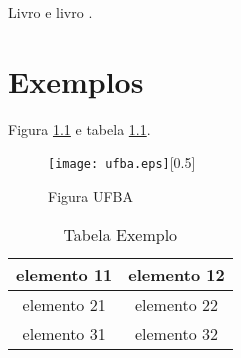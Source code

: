\documentclass[phd, classic, a4paper]{ufbathesis}
\begin{document}
\tableofcontents

\listoffigures

\listoftables

\mainmatter

% 
% 
% 
%


\lipsum


\lipsum

Livro \cite{demeyer2008} e  livro \cite{raymond1999}.

\chapter{Exemplos}

Figura \ref{default-regular} e tabela \ref{default-table}.
\begin{figure}[htbp]
\begin{center}
  \texttt{[image: ufba.eps]}[0.5]
\caption{Figura UFBA}
\label{default-regular}
\end{center}
\end{figure}

\begin{table}[htdp]
\caption{Tabela Exemplo}
\begin{center}
\begin{tabular}{|c|c|} 
\hline
elemento 11 & elemento 12 \\ \hline
elemento 21 & elemento 22 \\ \hline
elemento 31 & elemento 32 \\
\hline
\end{tabular}
\end{center}
\label{default-table}
\end{table}%
\end{document}
